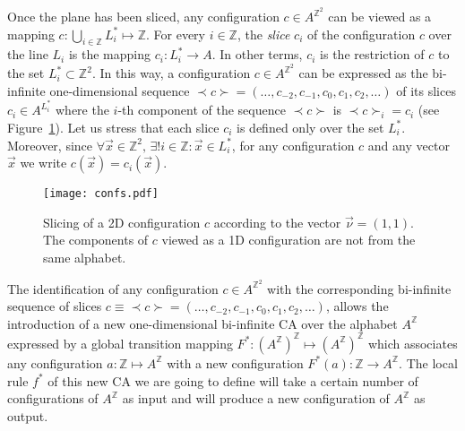 \documentclass{llncs}
\newcommand{\z}{\ensuremath{\mathbb{Z}}\xspace}
\newcommand{\az}{\ensuremath{A^{\mathbb{Z}}}\xspace}
\newcommand{\zdu}{\ensuremath{\mathbb{Z}^2}\xspace}
\newcommand{\azdu}{\ensuremath{A^{\zdu}}\xspace}
\newcommand{\nn}{\vec\nu}
\newcommand{\xx}{\vec x}
\begin{document}
Once the plane has been sliced, any configuration $c\in \azdu$ can
be viewed as a mapping $c:\bigcup_{i\in\z}L_i^*\mapsto\z$. For
every $i\in\z$, the \emph{slice} $c_i$ of the configuration $c$
over the line $L_i$ is the mapping $c_i:L^*_i\to A$. In other
terms, $c_i$ is the restriction of $c$ to the set
$L^*_i\subset\zdu$. In this way, a configuration $c\in\azdu$ can
be expressed as the bi-infinite one-dimensional sequence $\prec
c\succ=(\ldots, c_{-2}, c_{-1}, c_{0}, c_{1}, c_2,\ldots)$ of its
slices $c_i\in A^{L^*_i}$ where the $i$-th component of the
sequence $\prec c\succ$ is $\prec c\succ_i=c_i$ (see
Figure~\ref{fig:slicing-conf}). Let us stress that each slice
$c_i$ is defined only over the set $L^*_i$. Moreover, since
$\forall \xx\in\zdu,\,\exists ! i\in\z: \xx\in L^*_i$, for any
configuration $c$ and any vector $\xx$ we write $c(\xx)=c_i(\xx)$.
\begin{figure}[!htb]
  \begin{center}
     \texttt{[image: confs.pdf]}
   \end{center}
   \caption{Slicing of a 2D configuration $c$ according to the vector $\nn=(1,1)$.
   The components of $c$ viewed as a 1D configuration
   are not from the same alphabet.}
  \label{fig:slicing-conf}
\end{figure}


The identification of any configuration $c\in\azdu$ with the
corresponding bi-infinite sequence of slices $c \equiv \prec
c\succ=(\ldots, c_{-2}, c_{-1}, c_{0}, c_{1}, c_2, \ldots)$,
allows the introduction of a new one-dimensional bi-infinite CA
over the alphabet $\az$ expressed by a global transition mapping
$F^*:(\az)^{\z}\mapsto(\az)^{\z}$ which associates any
configuration $a:\z\mapsto\az$ with a new configuration
$F^*(a):\z\to\az$. The local rule $f^*$ of this new CA we are
going to define will take a certain number of configurations of
$\az$ as input and will produce a new configuration of $\az$ as
output.
\end{document}
